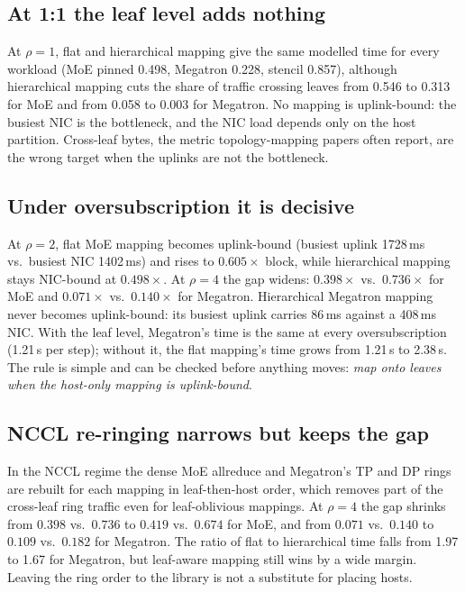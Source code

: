 \documentclass[conference]{IEEEtran}
\begin{document}
\subsection{At 1:1 the leaf level adds nothing}
At $\rho=1$, flat and hierarchical mapping give the same modelled time for every workload (MoE
pinned 0.498, Megatron 0.228, stencil 0.857), although hierarchical mapping cuts the share of
traffic crossing leaves from 0.546 to 0.313 for MoE and from 0.058 to 0.003 for Megatron. No
mapping is uplink-bound: the busiest NIC is the bottleneck, and the NIC load depends only on the
host partition. Cross-leaf bytes, the metric topology-mapping papers often report, are the wrong
target when the uplinks are not the bottleneck.

\subsection{Under oversubscription it is decisive}
At $\rho=2$, flat MoE mapping becomes uplink-bound (busiest uplink 1728\,ms vs.\ busiest NIC
1402\,ms) and rises to $0.605\times$ block, while hierarchical mapping stays NIC-bound at
$0.498\times$. At $\rho=4$ the gap widens: $0.398\times$ vs.\ $0.736\times$ for MoE and $0.071\times$
vs.\ $0.140\times$ for Megatron. Hierarchical Megatron mapping never becomes uplink-bound: its
busiest uplink carries 86\,ms against a 408\,ms NIC. With the leaf level, Megatron's time is the
same at every oversubscription (1.21\,s per step); without it, the flat mapping's time grows from
1.21\,s to 2.38\,s. The rule is simple and can be checked before anything moves: \emph{map onto
leaves when the host-only mapping is uplink-bound}.

\subsection{NCCL re-ringing narrows but keeps the gap}
In the NCCL regime the dense MoE allreduce and Megatron's TP and DP rings are rebuilt for each
mapping in leaf-then-host order, which removes part of the cross-leaf ring traffic even for
leaf-oblivious mappings. At $\rho=4$ the gap shrinks from $0.398$ vs.\ $0.736$ to $0.419$ vs.\
$0.674$ for MoE, and from $0.071$ vs.\ $0.140$ to $0.109$ vs.\ $0.182$ for Megatron. The ratio of
flat to hierarchical time falls from 1.97 to 1.67 for Megatron, but leaf-aware mapping still wins
by a wide margin. Leaving the ring order to the library is not a substitute for placing hosts.
\end{document}
